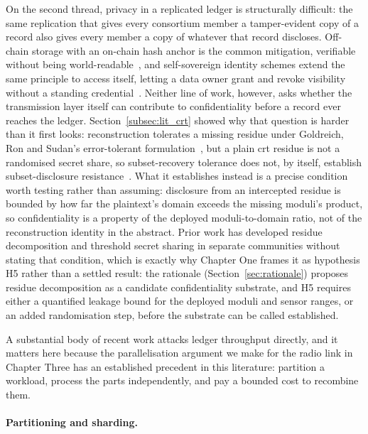 \documentclass[12pt,a4paper,oneside]{book}
\begin{document}
On the second thread, privacy in a replicated ledger is structurally
difficult: the same replication that gives every consortium member a
tamper-evident copy of a record also gives every member a copy of whatever
that record discloses. Off-chain storage with an on-chain hash anchor is
the common mitigation, verifiable without being
world-readable~\cite{kim2023privacy}, and self-sovereign identity schemes
extend the same principle to access itself, letting a data owner grant and
revoke visibility without a standing
credential~\cite{amraouy2025ssi}. Neither line of work, however, asks
whether the transmission layer itself can contribute to confidentiality
before a record ever reaches the ledger. Section~\ref{subsec:lit_crt}
showed why that question is harder than it first looks: reconstruction
tolerates a missing residue under Goldreich, Ron and Sudan's
error-tolerant formulation~\cite{goldreich1999china}, but a plain
\gls{crt} residue is not a randomised secret share, so subset-recovery
tolerance does not, by itself, establish subset-disclosure
resistance~\cite{shoup2009computational}. What it establishes instead is
a precise condition worth testing rather than assuming: disclosure from
an intercepted residue is bounded by how far the plaintext's domain
exceeds the missing moduli's product, so confidentiality is a property of
the deployed moduli-to-domain ratio, not of the reconstruction identity
in the abstract. Prior work has developed residue decomposition and
threshold secret sharing in separate communities
without stating that condition, which is exactly why Chapter One frames
it as hypothesis H5 rather than a settled result: the rationale
(Section~\ref{sec:rationale}) proposes residue decomposition as a
candidate confidentiality substrate, and H5 requires either a quantified
leakage bound for the deployed moduli and sensor ranges, or an added
randomisation step, before the substrate can be called established.

\label{subsec:lit_scalability}

A substantial body of recent work attacks ledger throughput directly, and it
matters here because the parallelisation argument we make for the radio link
in Chapter Three has an established precedent in this literature: partition a
workload, process the parts independently, and pay a bounded cost to
recombine them.

\paragraph{Partitioning and sharding.}
\end{document}
